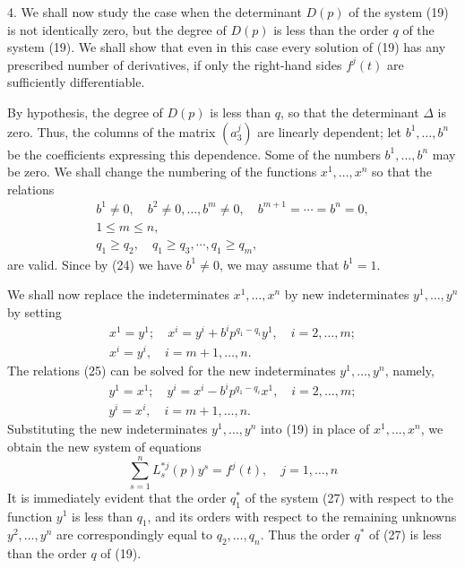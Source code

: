 \documentclass[10pt,a5paper]{book}
\theoremstyle{plain}
\theoremstyle{definition}
\theoremstyle{remark}
\begin{document}
4. We shall now study the case when the determinant $D(p)$ of the system (19) is not identically zero, but the degree of $D(p)$ is less than the order $q$ of the system (19). We shall show that even in this case every solution of (19) has any prescribed number of derivatives, if only the right-hand sides $f^{j}(t)$ are sufficiently differentiable.

By hypothesis, the degree of $D(p)$ is less than $q$, so that the determinant $\Delta$ is zero. Thus, the columns of the matrix $\left(a_{3}^{j}\right)$ are linearly dependent; let $b^{1}, \ldots, b^{n}$ be the coefficients expressing this dependence. Some of the numbers $b^{1}, \ldots, b^{n}$ may be zero. We shall change the numbering of the functions $x^{1}, \ldots, x^{n}$ so that the relations
\begin{gather*}
b^{1} \neq 0, \quad b^{2} \neq 0, \ldots, b^{m} \neq 0, \quad b^{m+1}=\cdots=b^{n}=0, \\
1 \leq m \leq n,  \tag{24}\\
q_{1} \geq q_{2}, \quad q_{1} \geq q_{3}, \cdots, q_{1} \geq q_{m},
\end{gather*}
are valid. Since by (24) we have $b^{1} \neq 0$, we may assume that $b^{1}=1$.

We shall now replace the indeterminates $x^{1}, \ldots, x^{n}$ by new indeterminates $y^{1}, \ldots, y^{n}$ by setting
\begin{gather*}
x^{1}=y^{1} ; \quad x^{i}=y^{i}+b^{i} p^{q_{1}-q_{i}} y^{1}, \quad i=2, \ldots, m ; \\
x^{i}=y^{i}, \quad i=m+1, \ldots, n . \tag{25}
\end{gather*}
The relations (25) can be solved for the new indeterminates $y^{1}, \ldots, y^{n}$, namely,
\begin{gather*}
y^{1}=x^{1} ; \quad y^{i}=x^{i}-b^{i} p^{q_{1}-q_{i}} x^{1}, \quad i=2, \ldots, m ; \\
y^{i}=x^{i}, \quad i=m+1, \ldots, n . \tag{26}
\end{gather*}
Substituting the new indeterminates $y^{1}, \ldots, y^{n}$ into (19) in place of $x^{1}, \ldots, x^{n}$, we obtain the new system of equations
\begin{equation*}
\sum_{s=1}^{n} L_{s}^{* j}(p) y^{s}=f^{j}(t), \quad j=1, \ldots, n \tag{27}
\end{equation*}
It is immediately evident that the order $q_{1}^{*}$ of the system (27) with respect to the function $y^{1}$ is less than $q_{1}$, and its orders with respect to the remaining unknowns $y^{2}, \ldots, y^{n}$ are correspondingly equal to $q_{2}, \ldots, q_{n}$. Thus the order $q^{*}$ of (27) is less than the order $q$ of (19).
\end{document}
